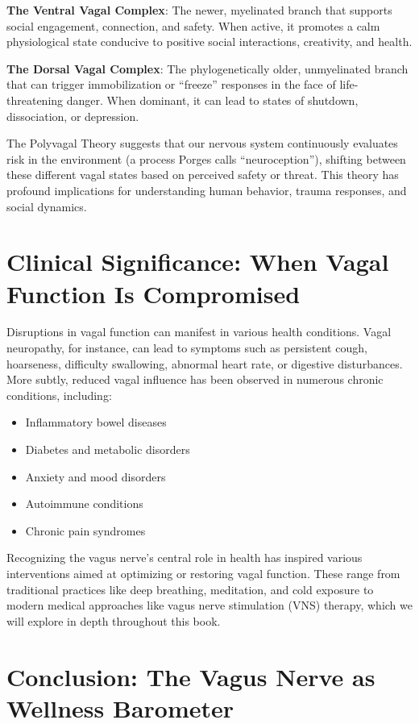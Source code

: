 \documentclass[
  Letterpaper,
]{scrbook}
\providecommand{\tightlist}{%
  \setlength{\itemsep}{0pt}\setlength{\parskip}{0pt}}\usepackage{longtable,booktabs,array}
\begin{document}
\textbf{The Ventral Vagal Complex}: The newer, myelinated branch that
supports social engagement, connection, and safety. When active, it
promotes a calm physiological state conducive to positive social
interactions, creativity, and health.

\textbf{The Dorsal Vagal Complex}: The phylogenetically older,
unmyelinated branch that can trigger immobilization or ``freeze''
responses in the face of life-threatening danger. When dominant, it can
lead to states of shutdown, dissociation, or depression.

The Polyvagal Theory suggests that our nervous system continuously
evaluates risk in the environment (a process Porges calls
``neuroception''), shifting between these different vagal states based
on perceived safety or threat. This theory has profound implications for
understanding human behavior, trauma responses, and social dynamics.

\section{Clinical Significance: When Vagal Function Is
Compromised}\label{clinical-significance-when-vagal-function-is-compromised}

Disruptions in vagal function can manifest in various health conditions.
Vagal neuropathy, for instance, can lead to symptoms such as persistent
cough, hoarseness, difficulty swallowing, abnormal heart rate, or
digestive disturbances. More subtly, reduced vagal influence has been
observed in numerous chronic conditions, including:

\begin{itemize}
\tightlist
\item
  Inflammatory bowel diseases
\item
  Diabetes and metabolic disorders
\item
  Anxiety and mood disorders
\item
  Autoimmune conditions
\item
  Chronic pain syndromes
\end{itemize}

Recognizing the vagus nerve's central role in health has inspired
various interventions aimed at optimizing or restoring vagal function.
These range from traditional practices like deep breathing, meditation,
and cold exposure to modern medical approaches like vagus nerve
stimulation (VNS) therapy, which we will explore in depth throughout
this book.

\section{Conclusion: The Vagus Nerve as Wellness
Barometer}\label{conclusion-the-vagus-nerve-as-wellness-barometer}
\end{document}

